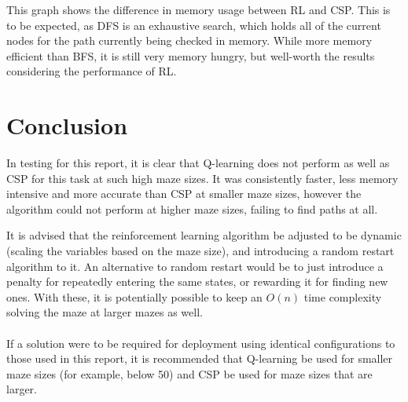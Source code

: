 \documentclass{article}
\newcommand\tab[1][1cm]{\hspace*{#1}}
\begin{document}
         \tab This graph shows the difference in memory usage between RL and CSP. 
         This is to be expected, as DFS is an exhaustive search, which holds 
         all of the current nodes for the path currently being checked in 
         memory. While more memory efficient than BFS, it is still very 
         memory hungry, but well-worth the results considering the 
         performance of RL.

    \section{Conclusion}\label{sec:conclusion}

        \tab In testing for this report, it is clear that Q-learning does not 
        perform as well as CSP for this task at such high maze sizes. 
        It was consistently faster, less memory intensive and more accurate 
        than CSP at smaller maze sizes, however the algorithm could not perform 
        at higher maze sizes, failing to find paths at all.

        \tab It is advised that the reinforcement learning algorithm be adjusted
        to be dynamic (scaling the variables based on the maze size), and
        introducing a random restart algorithm to it. An alternative to random
        restart would be to just introduce a penalty for repeatedly entering the
        same states, or rewarding it for finding new ones. With these, it is
        potentially possible to keep an $O(n)$ time complexity solving the maze at
        larger mazes as well.
        \\ \\
        If a solution were to be required for deployment using identical 
        configurations to those used in this report, it is recommended that 
        Q-learning be used for smaller maze sizes (for example, below 50) and 
        CSP be used for maze sizes that are larger.

    
    
\end{document}
